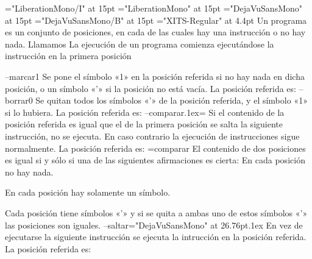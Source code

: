 \font\fgramatnotermg="LiberationMono/I" at 15pt
\font\fgramattermg="LiberationMono" at 15pt
\font\fcodeinsc="DejaVuSansMono" at 15pt
\font\fcodeinscs="DejaVuSansMono/B" at 15pt
\font\fsimbsinsc="XITS-Regular" at 4.4pt
\def\notermparsg#1{{\fcodeinsc\kern-.1em ⟨{\fgramatnotermg#1}⟩}}
%
Un programa es un conjunto de posiciones, en cada de las cuales hay una instrucción o no hay
nada. Llamamos La ejecución de un programa comienza ejecutándose la instrucción en la primera posición

\noindent\insc--{marcar}1%
Se pone el símbolo «1» en la posición referida si no hay nada en dicha posición, o un símbolo «’» si la
posición no está vacía. La posición referida es:
\insc--{borrar}0%
Se quitan todos los símbolos «’» de la posición referida, y el símbolo «1» si lo hubiera. La
posición referida es:
\insc--{comparar}{\raise.1ex\hbox{=}}%
Si el contenido de la posición referida es igual que el de la primera posición se salta la siguiente
instrucción, no se ejecuta. En caso contrario la ejecución de instrucciones sigue normalmente. La
posición referida es:
\listainsc={comparar}
El contenido de dos posiciones es igual si y sólo si una de las siguientes afirmaciones es cierta:
\listanormal
En cada posición no hay nada.\par
En cada posición hay solamente un símbolo.\par
Cada posición tiene símbolos «’» y si se quita a ambas uno de estos símbolos «’» las posiciones son iguales.
\finlista
\insc--{saltar}{\font\festrella="DejaVuSansMono" at 26.76pt\raise.1ex\hbox{\estrella}}%
En vez de ejecutarse la siguiente instrucción se ejecuta la intrucción en la posición referida. La
posición referida es:



\footline{}


